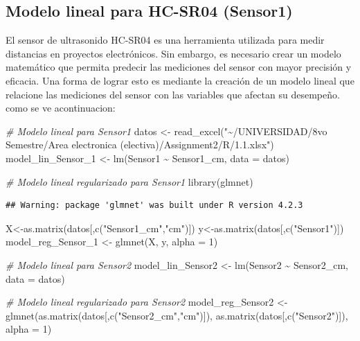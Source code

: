\documentclass[
]{article}
\newenvironment{Shaded}{\begin{snugshade}}{\end{snugshade}}
\newcommand{\AttributeTok}[1]{\textcolor[rgb]{0.77,0.63,0.00}{#1}}
\newcommand{\CommentTok}[1]{\textcolor[rgb]{0.56,0.35,0.01}{\textit{#1}}}
\newcommand{\DecValTok}[1]{\textcolor[rgb]{0.00,0.00,0.81}{#1}}
\newcommand{\FunctionTok}[1]{\textcolor[rgb]{0.00,0.00,0.00}{#1}}
\newcommand{\NormalTok}[1]{#1}
\newcommand{\OtherTok}[1]{\textcolor[rgb]{0.56,0.35,0.01}{#1}}
\newcommand{\SpecialCharTok}[1]{\textcolor[rgb]{0.00,0.00,0.00}{#1}}
\newcommand{\StringTok}[1]{\textcolor[rgb]{0.31,0.60,0.02}{#1}}
\begin{document}
\hypertarget{modelo-lineal-para-hc-sr04-sensor1}{%
\subsection{Modelo lineal para HC-SR04
(Sensor1)}\label{modelo-lineal-para-hc-sr04-sensor1}}

El sensor de ultrasonido HC-SR04 es una herramienta utilizada para medir
distancias en proyectos electrónicos. Sin embargo, es necesario crear un
modelo matemático que permita predecir las mediciones del sensor con
mayor precisión y eficacia. Una forma de lograr esto es mediante la
creación de un modelo lineal que relacione las mediciones del sensor con
las variables que afectan su desempeño. como se ve acontinuacion:

\begin{Shaded}
\begin{Highlighting}[]
\CommentTok{\# Modelo lineal para Sensor1}
\NormalTok{datos }\OtherTok{\textless{}{-}} \FunctionTok{read\_excel}\NormalTok{(}\StringTok{"\textasciitilde{}/UNIVERSIDAD/8vo Semestre/Area electronica (electiva)/Assignment2/R/1.1.xlsx"}\NormalTok{)}
\NormalTok{model\_lin\_Sensor\_1 }\OtherTok{\textless{}{-}} \FunctionTok{lm}\NormalTok{(Sensor1 }\SpecialCharTok{\textasciitilde{}}\NormalTok{ Sensor1\_cm, }\AttributeTok{data =}\NormalTok{ datos)}

\CommentTok{\# Modelo lineal regularizado para Sensor1}
\FunctionTok{library}\NormalTok{(glmnet)}
\end{Highlighting}
\end{Shaded}

\begin{verbatim}
## Warning: package 'glmnet' was built under R version 4.2.3
\end{verbatim}

\begin{Shaded}
\begin{Highlighting}[]
\NormalTok{X}\OtherTok{\textless{}{-}}\FunctionTok{as.matrix}\NormalTok{(datos[,}\FunctionTok{c}\NormalTok{(}\StringTok{"Sensor1\_cm"}\NormalTok{,}\StringTok{"cm"}\NormalTok{)])}
\NormalTok{y}\OtherTok{\textless{}{-}}\FunctionTok{as.matrix}\NormalTok{(datos[,}\FunctionTok{c}\NormalTok{(}\StringTok{"Sensor1"}\NormalTok{)])}
\NormalTok{model\_reg\_Sensor\_1 }\OtherTok{\textless{}{-}} \FunctionTok{glmnet}\NormalTok{(X, y, }\AttributeTok{alpha =} \DecValTok{1}\NormalTok{)}

\CommentTok{\# Modelo lineal para Sensor2}
\NormalTok{model\_lin\_Sensor2 }\OtherTok{\textless{}{-}} \FunctionTok{lm}\NormalTok{(Sensor2 }\SpecialCharTok{\textasciitilde{}}\NormalTok{ Sensor2\_cm, }\AttributeTok{data =}\NormalTok{ datos)}

\CommentTok{\# Modelo lineal regularizado para Sensor2}
\NormalTok{model\_reg\_Sensor2 }\OtherTok{\textless{}{-}} \FunctionTok{glmnet}\NormalTok{(}\FunctionTok{as.matrix}\NormalTok{(datos[,}\FunctionTok{c}\NormalTok{(}\StringTok{"Sensor2\_cm"}\NormalTok{,}\StringTok{"cm"}\NormalTok{)]), }\FunctionTok{as.matrix}\NormalTok{(datos[,}\FunctionTok{c}\NormalTok{(}\StringTok{"Sensor2"}\NormalTok{)]), }\AttributeTok{alpha =} \DecValTok{1}\NormalTok{)}
\end{Highlighting}
\end{Shaded}
\end{document}
